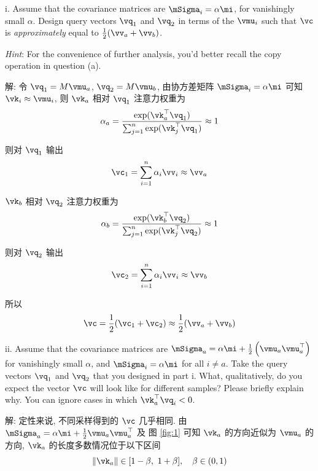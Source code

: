 \documentclass[openany]{ctexbook}
\theoremstyle{kaiti}
\theoremstyle{normal}
\begin{document}
\quad i. Assume that the covariance matrices are $\mSigma_{i}=\alpha \mi$, for vanishingly small $\alpha$. Design query vectors $\vq_1$ and $\vq_2$ in terms of the $\vmu_i$ such that $\vc$ is \emph{approximately} equal to $\frac{1}{2}(\vv_{a}+\vv_{b})$.

\emph{Hint}: For the convenience of further analysis, you'd better recall the copy operation in question (a).

解: 令 $\vq_1=M\vmu_a$, $\vq_2=M\vmu_b$, 由协方差矩阵 $\mSigma_{i}=\alpha \mi$ 可知 $\vk_i\approx\vmu_i$, 则 $\vk_a$ 相对 $\vq_1$ 注意力权重为
\begin{equation}
  \alpha_a
  =\frac{\exp(\vk_{a}^{\top}\vq_1)}{\sum_{j=1}^{n}\exp(\vk_{j}^{\top}\vq_1)}
  \approx1
\end{equation}

则对 $\vq_1$ 输出
\begin{equation}
  \vc_1
  =\sum_{i=1}^{n}\alpha_{i}\vv_{i}
  \approx\vv_a
\end{equation}

$\vk_b$ 相对 $\vq_2$ 注意力权重为
\begin{equation}
  \alpha_b
  =\frac{\exp(\vk_{b}^{\top}\vq_2)}{\sum_{j=1}^{n}\exp(\vk_{j}^{\top}\vq_2)}
  \approx1
\end{equation}

则对 $\vq_2$ 输出
\begin{equation}
  \vc_2
  =\sum_{i=1}^{n}\alpha_{i}\vv_{i}
  \approx\vv_b
\end{equation}

所以
\begin{equation}
  \vc=\frac{1}{2}(\vc_{1}+\vc_{2})\approx\frac{1}{2}(\vv_{a}+\vv_{b})
\end{equation}

\quad ii. Assume that the covariance matrices are $ \mSigma_{a}=\alpha\mi+\frac{1}{2}\left(\vmu_{a} \vmu_{a}^{\top}\right) $ for vanishingly small $\alpha$, and $\mSigma_{i}=\alpha \mi$ for all $i \neq a$. Take the query vectors $\vq_1$ and $\vq_2$ that you designed in part i. What, qualitatively, do you expect the vector $\vc$ will look like for different samples? Please briefly explain why. You can ignore cases in which $\vk_{a}^{\top}\vq_{i}<0$.

解: 定性来说, 不同采样得到的 $\vc$ 几乎相同. 由 $\mSigma_{a}=\alpha \mi+\frac{1}{2}\vmu_{a} \vmu_{a}^{\top}$ 及 图 \ref{fig:1} 可知 $\vk_a$ 的方向近似为 $\vmu_a$ 的方向, $\vk_a$ 的长度多数情况位于以下区间
\begin{equation}
  \|\vk_a\|\in[1-\beta,~1+\beta],\quad\beta\in(0,1)
\end{equation}
\end{document}
